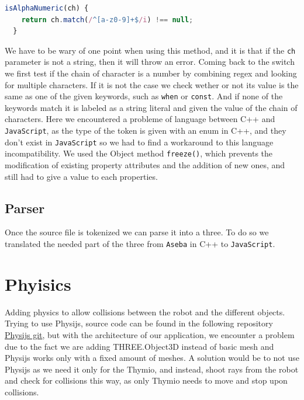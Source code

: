 \documentclass{scrbook}
\begin{document}
\begin{lstlisting}[language=JavaScript, basicstyle=\ttfamily\small]
  isAlphaNumeric(ch) {
    return ch.match(/^[a-z0-9]+$/i) !== null;
  }
\end{lstlisting}

We have to be wary of one point when using this method, and it is that if the \texttt{ch} parameter is not a string, then it will throw an error. Coming back to the switch we first test if the chain of character is a number by combining regex and looking for multiple characters.
If it is not the case we check wether or not its value is the same as one of the given keywords, such as \texttt{when} or \texttt{const}. And if none of the keywords match it is labeled as a string literal and given the value of the chain of characters. Here we encountered a probleme 
of language between C++ and \texttt{JavaScript}, as the type of the token is given with an enum in C++, and they don't exist in \texttt{JavaScript} so we had to find a workaround to this language incompatibility. We used the Object method \texttt{freeze()}, which prevents the modification of existing property attributes and the addition of new ones, 
and still had to give a value to each properties.

\subsection{Parser}

Once the source file is tokenized we can parse it into a three. To do so we translated the needed part of the three from \texttt{Aseba} in C++ to \texttt{JavaScript}.


\section{Phyisics}

Adding physics to allow collisions between the robot and the different objects. Trying to use Physijs, source code can be found in the following repository \href{https://github.com/chandlerprall/Physijs/wiki/Basic-Setup}{Physijs git}, 
but with the architecture of our application, we encounter a problem due to the fact we are adding THREE.Object3D instead of basic mesh and Physijs works only with a fixed amount of meshes. A solution would be to not use Physijs as we need it only for the Thymio,
and instead, shoot rays from the robot and check for collisions this way, as only Thymio needs to move and stop upon collisions.
\end{document}
